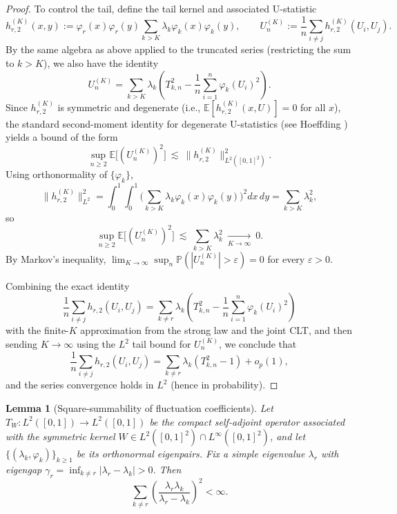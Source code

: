 \documentclass[11pt]{article}
\theoremstyle{plain}
\newtheorem{lemma}[theorem]{Lemma}
\theoremstyle{remark}
\begin{document}
\begin{proof}
To control the tail, define the tail kernel and associated U-statistic
\[
h_{r,2}^{(K)}(x,y):=\varphi_r(x)\varphi_r(y)\sum_{k>K}\lambda_k\varphi_k(x)\varphi_k(y),
\qquad
U_n^{(K)}:=\frac{1}{n}\sum_{i\neq j} h_{r,2}^{(K)}(U_i,U_j).
\]
By the same algebra as above applied to the truncated series (restricting the sum to $k>K$), we also have the identity
\[
U_n^{(K)}=\sum_{k>K}\lambda_k\left(T_{k,n}^2-\frac{1}{n}\sum_{i=1}^n\varphi_k(U_i)^2\right).
\]
Since $h_{r,2}^{(K)}$ is symmetric and degenerate (i.e., $\mathbb{E}[h_{r,2}^{(K)}(x,U)]=0$ for all $x$), the standard second-moment identity for degenerate U-statistics (see Hoeffding \citet{hoeffding1992class}) yields a bound of the form
\[
\sup_{n\ge 2}\mathbb{E}\big[(U_n^{(K)})^2\big]\ \lesssim\ \|h_{r,2}^{(K)}\|_{L^2([0,1]^2)}^2.
\]
Using orthonormality of $\{\varphi_k\}$,
\[
\|h_{r,2}^{(K)}\|_{L^2}^2
=
\int_0^1\!\!\int_0^1\Big(\sum_{k>K}\lambda_k\varphi_k(x)\varphi_k(y)\Big)^2dx\,dy
=
\sum_{k>K}\lambda_k^2,
\]
so
\[
\sup_{n\ge 2}\mathbb{E}\big[(U_n^{(K)})^2\big]\ \lesssim\ \sum_{k>K}\lambda_k^2
\ \xrightarrow[K\to\infty]{}\ 0.
\]
By Markov's inequality,
$\lim_{K\to\infty}\sup_n\mathbb{P}(|U_n^{(K)}|>\varepsilon)=0$ for every $\varepsilon>0$.

Combining the exact identity
\[
\frac{1}{n}\sum_{i\neq j}h_{r,2}(U_i,U_j)
=
\sum_{k\neq r}\lambda_k\left(
T_{k,n}^2-\frac{1}{n}\sum_{i=1}^n\varphi_k(U_i)^2
\right)
\]
with the finite-$K$ approximation from the strong law and the joint CLT, and then sending $K\to\infty$ using the $L^2$ tail bound for $U_n^{(K)}$, we conclude that
\[
\frac{1}{n}\sum_{i\neq j}h_{r,2}(U_i,U_j)
=
\sum_{k\neq r}\lambda_k(T_{k,n}^2-1)+o_p(1),
\]
and the series convergence holds in $L^2$ (hence in probability).
\end{proof}

\begin{lemma}[Square-summability of fluctuation coefficients]\label{lem:squaresum}
Let \(T_W:L^2([0,1])\to L^2([0,1])\) be the compact self-adjoint operator associated with the symmetric kernel \(W\in L^2([0,1]^2)\cap L^\infty([0,1]^2)\), and let \(\{(\lambda_k,\varphi_k)\}_{k\ge1}\) be its orthonormal eigenpairs. 
Fix a simple eigenvalue \(\lambda_r\) with eigengap 
\(\gamma_r = \inf_{k\neq r} |\lambda_r - \lambda_k| > 0\).
Then
\[
\sum_{k\neq r} \left( \frac{\lambda_r\lambda_k}{\lambda_r - \lambda_k} \right)^2 < \infty.
\]
\end{lemma}
\end{document}
